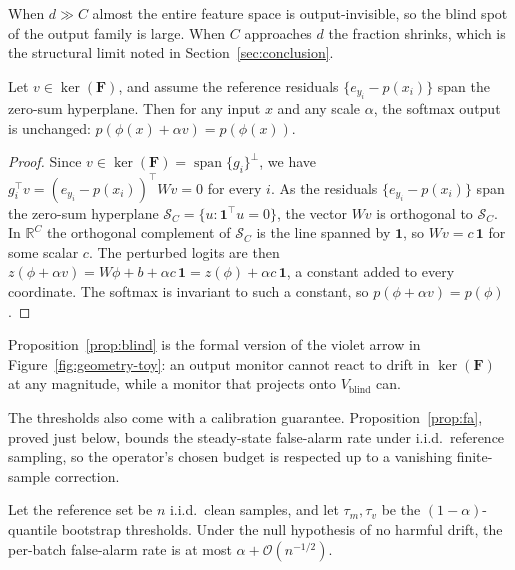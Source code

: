 \documentclass[sigconf,anonymous]{acmart}
\begin{document}
When $d \gg C$ almost the entire feature space is output-invisible, so the
blind spot of the output family is large. When $C$ approaches $d$ the fraction
shrinks, which is the structural limit noted in Section~\ref{sec:conclusion}.

\begin{proposition}
\label{prop:blind}
Let $v \in \ker(\mathbf{F})$, and assume the reference residuals
$\{e_{y_i}-p(x_i)\}$ span the zero-sum hyperplane. Then for any input $x$ and
any scale $\alpha$, the softmax output is unchanged:
$p(\phi(x)+\alpha v) = p(\phi(x))$.
\end{proposition}

\begin{proof}
Since $v \in \ker(\mathbf{F}) = \operatorname{span}\{g_i\}^{\perp}$, we have
$g_i^{\top} v = (e_{y_i}-p(x_i))^{\top} W v = 0$ for every $i$. As the
residuals $\{e_{y_i}-p(x_i)\}$ span the zero-sum hyperplane $\mathcal{S}_C =
\{u : \mathbf{1}^{\top} u = 0\}$, the vector $W v$ is orthogonal to
$\mathcal{S}_C$. In $\mathbb{R}^C$ the orthogonal complement of
$\mathcal{S}_C$ is the line spanned by $\mathbf{1}$, so $W v = c\,\mathbf{1}$
for some scalar $c$. The perturbed logits are then
$z(\phi+\alpha v) = W\phi + b + \alpha c\,\mathbf{1} = z(\phi)+\alpha c\,
\mathbf{1}$, a constant added to every coordinate. The softmax is invariant
to such a constant, so $p(\phi+\alpha v)=p(\phi)$.
\end{proof}

Proposition~\ref{prop:blind} is the formal version of the violet arrow in
Figure~\ref{fig:geometry-toy}: an output monitor cannot react to drift in
$\ker(\mathbf{F})$ at any magnitude, while a monitor that projects onto
$V_{\text{blind}}$ can.

The thresholds also come with a calibration guarantee.
Proposition~\ref{prop:fa}, proved just below, bounds the
steady-state false-alarm rate under i.i.d.\ reference sampling, so the
operator's chosen budget is respected up to a vanishing finite-sample
correction.

\begin{proposition}
\label{prop:fa}
Let the reference set be $n$ i.i.d.\ clean samples, and let $\tau_m,\tau_v$ be
the $(1-\alpha)$-quantile bootstrap thresholds. Under the null hypothesis of
no harmful drift, the per-batch false-alarm rate is at most
$\alpha + \mathcal{O}(n^{-1/2})$.
\end{proposition}
\end{document}
